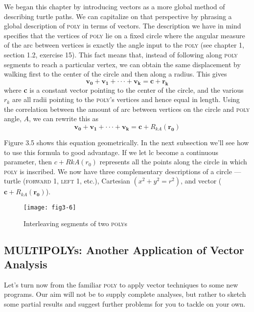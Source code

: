 \documentclass{book}
\begin{document}
We began this chapter by introducing vectors as a more global method
of describing turtle paths. We can capitalize on that perspective by
phrasing a global description of \textsc{poly} in terms of vectors. The description
we have in mind specifies that the vertices of \textsc{poly} lie on a fixed circle
where the angular measure of the arc between vertices is exactly the
angle input to the \textsc{poly} (see chapter 1, section 1.2, exercise 15). This
fact means that, instead of following along \textsc{poly} segments to reach a
particular vertex, we can obtain the same displacement by walking first
to the center of the circle and then along a radius. This gives
$$\mathbf{v_0} + \mathbf{v_1} + \cdot \cdot \cdot + \mathbf{v_k} = \mathbf{c} + \mathbf{r_k}$$
\noindent where \textbf{c} is a constant vector pointing to the center of the circle, and the
various \textbf{$r_k$} are all radii pointing to the \textsc{poly}'s vertices and hence equal
in length. Using the correlation between the amount of arc between
vertices on the circle and \textsc{poly} angle, $A$, we can rewrite this as
$$\mathbf{v_0} + \mathbf{v_1} + \cdot \cdot \cdot + \mathbf{v_k} = \mathbf{c} + R_{kA}(\mathbf{r_0})$$

Figure 3.5 shows this equation geometrically. In the next subsection
we'll see how to use this formula to good advantage.
If we let lc become a continuous parameter, then $c+RkA(r_0)$ represents
all the points along the circle in which \textsc{poly} is inscribed. We now
have three complementary descriptions of a circle --- turtle (\textsc{forward} 1,
\textsc{left} 1, etc.), Cartesian $(x^2 + y^2 = r^2)$, and vector ($\mathbf{c} + R_{kA}(\mathbf{r_0})$).

\begin{figure}
\begin{center}
\texttt{[image: fig3-6]}
\caption{Interleaving segments of two \textsc{poly}s}
\end{center}
\end{figure}

\subsection{MULTIPOLYs: Another Application of Vector Analysis}

Let's turn now from the familiar \textsc{poly} to apply vector techniques to
some new programs. Our aim will not be to supply complete analyses,
but rather to sketch some partial results and suggest further problems
for you to tackle on your own.
\end{document}
